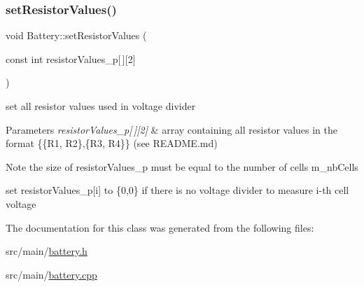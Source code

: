 \subsubsection{\texorpdfstring{set\+Resistor\+Values()}{setResistorValues()}}
{\footnotesize\ttfamily void Battery\+::set\+Resistor\+Values (\begin{DoxyParamCaption}\item[{const int}]{resistor\+Values\+\_\+p\mbox{[}$\,$\mbox{]}\mbox{[}2\mbox{]} }\end{DoxyParamCaption})}



set all resistor values used in voltage divider 


\begin{DoxyParams}{Parameters}
{\em resistor\+Values\+\_\+p\mbox{[}$\,$\mbox{]}\mbox{[}2\mbox{]}} & array containing all resistor values in the format \{\{R1, R2\},\{R3, R4\}\} (see R\+E\+A\+D\+M\+E.\+md) \\
\hline
\end{DoxyParams}
\begin{DoxyNote}{Note}
the size of resistor\+Values\+\_\+p must be equal to the number of cells m\+\_\+nb\+Cells 

set resistor\+Values\+\_\+p\mbox{[}i\mbox{]} to \{0,0\} if there is no voltage divider to measure i-\/th cell voltage 
\end{DoxyNote}


The documentation for this class was generated from the following files\+:\begin{DoxyCompactItemize}
\item 
src/main/\hyperlink{battery_8h}{battery.\+h}\item 
src/main/\hyperlink{battery_8cpp}{battery.\+cpp}\end{DoxyCompactItemize}
